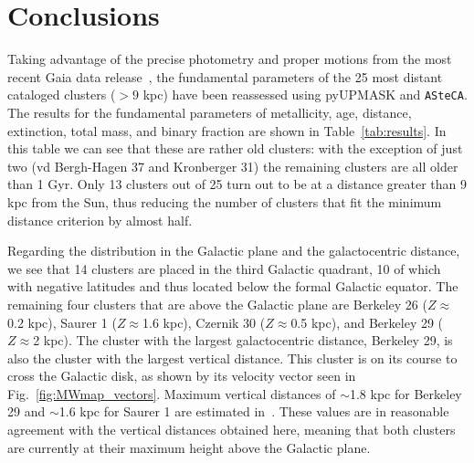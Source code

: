 \documentclass{aa}
\begin{document}
\section{Conclusions}
 \label{sec:conclusions}

  Taking advantage of the precise photometry and proper motions from the
  most recent Gaia data release~\citep{Gaia_EDR3}, the fundamental parameters
  of the 25 most distant cataloged clusters ($>9$ kpc) have been
  reassessed using pyUPMASK and \texttt{ASteCA}.
  The results for the fundamental parameters of metallicity, age, distance,
  extinction, total mass, and binary fraction are shown in 
  Table~\ref{tab:results}. In this table we can see that these are
  rather old clusters: with the exception of just two (vd Bergh-Hagen 37 and
  Kronberger 31) the remaining clusters are all older than 1 Gyr.
  Only 13 clusters out of 25 turn out to be at a distance greater
  than 9 kpc from the Sun, thus reducing the number of clusters that fit the
  minimum distance criterion by almost half.

  Regarding the distribution in the Galactic plane and the galactocentric
  distance, we see that 14 clusters are placed in the third Galactic
  quadrant, 10 of which with negative latitudes and thus located below
  the formal Galactic equator. The remaining four clusters that are above the
  Galactic plane are Berkeley 26 ($Z\approx$0.2 kpc), Saurer 1
  ($Z\approx$1.6 kpc), Czernik 30 ($Z\approx$0.5 kpc), and Berkeley
  29 ($Z\approx$2 kpc). The cluster with the largest galactocentric distance,
  Berkeley 29, is also the cluster with the largest vertical distance. This
  cluster is on its course to cross the Galactic disk, as shown by its velocity
  vector seen in Fig.~\ref{fig:MWmap_vectors}. Maximum vertical distances
  of $\sim$1.8 kpc for Berkeley 29 and $\sim$1.6 kpc for Saurer 1 are estimated
  in~\cite{Gaia_Collaboration_2021}. These values are in reasonable agreement with the
  vertical distances obtained here, meaning that both clusters are currently at
  their maximum height above the Galactic plane.
\end{document}
